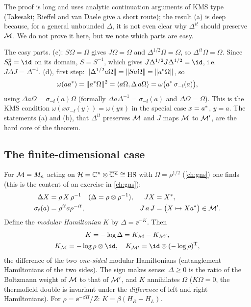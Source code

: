 The proof is long and uses analytic continuation arguments of KMS type (Takesaki; Rieffel and van Daele give a short route); the result (a) is deep because, for a general unbounded $\Delta$, it is not even clear why $\Delta^{it}$ should preserve $\mathcal{M}$. We do not prove it here, but we note which parts are easy.

\begin{proofsketch}
The easy parts. (c): $S\Omega=\Omega$ gives $J\Omega=\Omega$ and $\Delta^{1/2}\Omega=\Omega$, so $\Delta^{it}\Omega=\Omega$. Since $S_0^2=\id$ on its domain, $S=S^{-1}$, which gives $J\Delta^{1/2}J\Delta^{1/2}=\id$, i.e.\ $J\Delta J=\Delta^{-1}$. (d), first step: $\lVert \Delta^{1/2}a\Omega\rVert=\lVert Sa\Omega\rVert=\lVert a^{*}\Omega\rVert$, so
\[
\omega(aa^{*})=\lVert a^{*}\Omega\rVert^2=\langle a\Omega,\Delta\,a\Omega\rangle=\omega\big(a^{*}\,\sigma_{-\mathrm{i}}(a)\big),
\]
using $\Delta a\Omega=\sigma_{-\ii}(a)\Omega$ (formally $\Delta a\Delta^{-1}=\sigma_{-\ii}(a)$ and $\Delta\Omega=\Omega$). This is the KMS condition $\omega(x\sigma_{-\ii}(y))=\omega(yx)$ in the special case $x=a^{*}$, $y=a$. The statements (a) and (b), that $\Delta^{it}$ preserves $\mathcal{M}$ and $J$ maps $\mathcal{M}$ to $\mathcal{M}'$, are the hard core of the theorem.
\end{proofsketch}

\subsection{The finite-dimensional case}

For $\mathcal{M}=M_n$ acting on $\mathcal{H}=\mathbb{C}^n\otimes\overline{\mathbb{C}^n}\cong\mathrm{HS}$ with $\Omega=\rho^{1/2}$ (\cref{ch:gns}) one finds (this is the content of an exercise in \cref{ch:gns}):
\begin{align}
\Delta X&=\rho\,X\,\rho^{-1}\quad(\Delta=\rho\otimes\rho^{-1}),&JX&=X^{*},\\
\sigma_t(a)&=\rho^{it}a\rho^{-it},&J\,a\,J&=\big(X\mapsto Xa^{*}\big)\in\mathcal{M}'.
\end{align}
Define the \emph{modular Hamiltonian} $K$ by $\Delta=\ee^{-K}$. Then
\begin{equation}
\begin{gathered}[b]K=-\log\Delta=K_{\M}-K_{\M'},\\ K_\M=-\log\rho\otimes\id,\quad K_{\M'}=\id\otimes(-\log\rho)^{\rm T},\end{gathered}
\end{equation}
the difference of the two \emph{one-sided} modular Hamiltonians (entanglement Hamiltonians of the two sides). The sign makes sense: $\Delta\ge0$ is the ratio of the Boltzmann weight of $\mathcal{M}$ to that of $\mathcal{M}'$, and $K$ annihilates $\Omega$ ($K\Omega=0$, the thermofield double is invariant under the \emph{difference} of left and right Hamiltonians). For $\rho=\ee^{-\beta H}/Z$: $K=\beta(H_R-H_L)$.

